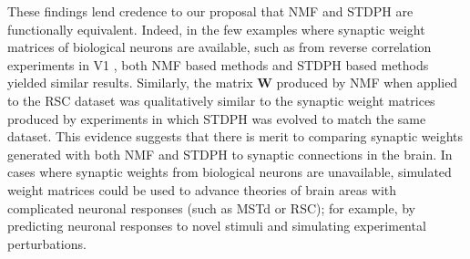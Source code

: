 These findings lend credence to our proposal that \ac{NMF} and \ac{STDPH} are functionally equivalent. Indeed, in the few examples where synaptic weight matrices
of biological neurons are available,
such as from reverse correlation experiments in
V1 \citep{Smyth2003}, both \ac{NMF} based methods \citep{Hoyer2003} and \ac{STDPH} based methods \citep{Carlson2013} yielded similar results. Similarly, the matrix \textbf{W} produced by \ac{NMF} when applied to the \ac{RSC} dataset was qualitatively similar to the synaptic weight matrices produced by experiments in which \ac{STDPH} was evolved to match the same dataset.
This evidence suggests that there is merit to comparing
synaptic weights generated with both \ac{NMF} and \ac{STDPH} to
synaptic connections in the brain.
In cases where synaptic weights from biological neurons are unavailable,
simulated weight matrices could be used to advance theories of brain areas 
with complicated neuronal responses
(such as \ac{MSTd} or \ac{RSC});
for example, by predicting neuronal responses to novel stimuli
and simulating experimental perturbations.

% 

